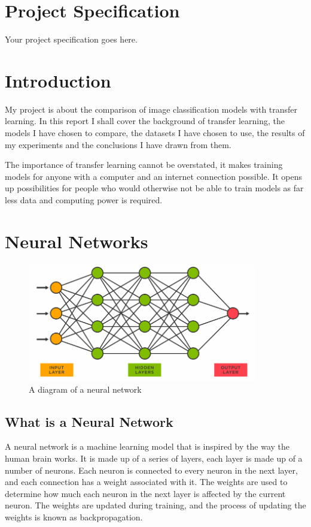 \documentclass[]{final_report}
\begin{document}
\chapter*{Project Specification}
Your project specification goes here.

\chapter{Introduction}

My project is about the comparison of image classification models with transfer learning.
In this report I shall cover the background of transfer learning, the models I have chosen to compare,
the datasets I have chosen to use, the results of my experiments and the conclusions I have drawn from them.

The importance of transfer learning cannot be overstated, it makes training models for anyone with a computer and an internet connection possible.
It opens up possibilities for people who would otherwise not be able to train models as far less data and computing power is required.

\chapter{Neural Networks}
\begin{figure}[ht!]
  \centering
  \includegraphics[width=100mm]{images/NeuralNetwork.png}
  \caption{A diagram of a neural network \cite{NeuralNetworkDiagram}}
\end{figure}

\section{What is a Neural Network}
A neural network is a machine learning model that is inspired by the way the human brain works.
It is made up of a series of layers, each layer is made up of a number of neurons.
Each neuron is connected to every neuron in the next layer, and each connection has a weight associated with it.
The weights are used to determine how much each neuron in the next layer is affected by the current neuron.
The weights are updated during training, and the process of updating the weights is known as backpropagation.
\end{document}
